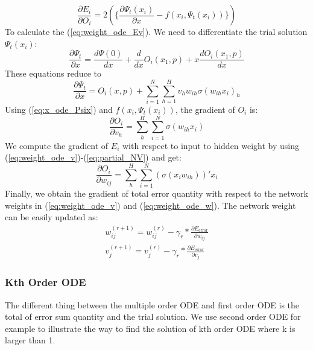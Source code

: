 \documentclass{article}
\begin{document}
\begin{equation}\label{eq:weight_ode_Ev}
\frac{\partial E_{i}}{\partial O_i} = 2(\{\frac{\partial \Psi_{t}(x_i)}{\partial x}-f(x_{i}, \Psi_{t}(x_i))\})
\end{equation}
\medskip \noindent
To calculate the (\ref{eq:weight_ode_Ev}). We need to differentiate the trial solution $\Psi_{t}(x_i)$:
\begin{equation}\label{eq: ode_trial_x}
\frac{\partial \Psi_{t} }{\partial x} = \frac{d \Psi (0)}{dx} + \frac{d}{dx}O_{i}(x_1,p) + x\frac{d O_{i}(x_1,p)}{dx}
\end{equation}
These equations reduce to 
\begin{equation}\label{eq:x_ode_Psix}
\frac{\partial \Psi_{t} }{\partial x} = O_{i}(x,p) + \sum_{i=1}^{N}\sum_{h=1}^{H} \textit{v}_{h} w_{ih} \sigma (w_{ih}x_{i})_{h} 
\end{equation}
Using (\ref{eq:x_ode_Psix}) and $f(x_{i}, \Psi_{t}(x_i))$, the gradient of $O_i$ is:
\begin{equation}\label{eq:partial_NV}
\frac{\partial O_i}{\partial v_{h}} = \sum_{h}^{H} \sum_{i=1}^{N}\sigma (w_{ih}x_{i})
\end{equation}
\medspace \noindent
We compute the gradient of $E_i$ with respect to input to hidden weight by using (\ref{eq:weight_ode_v})-(\ref{eq:partial_NV}) and get:
\begin{equation} \label{eq:weight_ode_ow}
\frac{\partial O_i}{\partial w_{ij}} = \sum_{h}^{H} \sum_{i=1}^{N} (\sigma(x_{i}w_{ih}))'x_i
\end{equation}
\medskip \noindent
Finally, we obtain the gradient of total error quantity with respect to the network weights in (\ref{eq:weight_ode_v}) and (\ref{eq:weight_ode_w}). The network weight can be easily updated as:
\begin{equation}
\begin{aligned}
w_{ij}^{(r+1)} = w_{ij}^{(r)} - \gamma_{r}*\frac{\partial E_\text{error}}{\partial w_{ij}} \\
v_{j}^{(r+1)} = v_{j}^{(r)} - \gamma_{r}*\frac{\partial E_\text{error}}{\partial v_{j}}
\end{aligned}
\end{equation}

\subsubsection{Kth Order ODE}

 The different thing between the multiple order ODE and first order ODE is the total of error sum quantity and the trial solution.  We use second order ODE for example to illustrate the way to find the solution of kth order ODE where k is larger than 1.  
\end{document}
